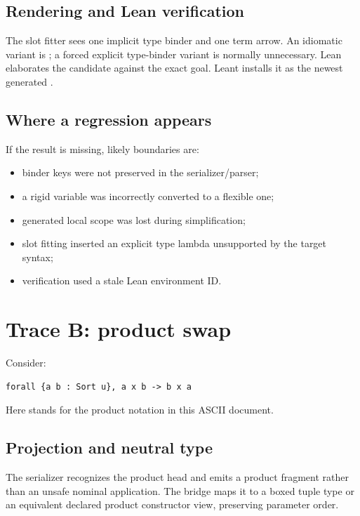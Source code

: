 \documentclass[10pt,letterpaper,oneside]{report}
\newcommand{\code}[1]{\texttt{\detokenize{#1}}}
\begin{document}
\subsection{Rendering and Lean verification}

The slot fitter sees one implicit type binder and one term arrow. An idiomatic variant is \code{fun x => x}; a forced explicit type-binder variant is normally unnecessary. Lean elaborates the candidate against the exact goal. Leant installs it as the newest generated \code{it}.

\subsection{Where a regression appears}

If the result is missing, likely boundaries are:

\begin{itemize}
  \item binder keys were not preserved in the serializer/parser;
  \item a rigid variable was incorrectly converted to a flexible one;
  \item generated local scope was lost during simplification;
  \item slot fitting inserted an explicit type lambda unsupported by the target syntax;
  \item verification used a stale Lean environment ID.
\end{itemize}

\section{Trace B: product swap}

Consider:

\begin{lstlisting}[language=Leanish]
forall {a b : Sort u}, a x b -> b x a
\end{lstlisting}

Here \code{x} stands for the product notation in this ASCII document.

\subsection{Projection and neutral type}

The serializer recognizes the product head and emits a product fragment rather than an unsafe nominal application. The bridge maps it to a boxed tuple type or an equivalent declared product constructor view, preserving parameter order.
\end{document}
